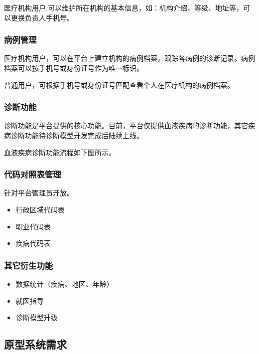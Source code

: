 \documentclass[UTF8,a4paper,12pt, onecolumn]{ctexart}
\begin{document}
医疗机构用户,可以维护所在机构的基本信息，如：机构介绍、等级、地址等，可以更换负责人手机号。

\subsubsection{病例管理}

医疗机构用户，可以在平台上建立机构的病例档案，跟踪各病例的诊断记录。病例档案可以按手机号或身份证号作为唯一标识。

普通用户，可根据手机号或身份证号匹配查看个人在医疗机构的病例档案。

\subsubsection{诊断功能}

诊断功能是平台提供的核心功能。目前，平台仅提供血液疾病的诊断功能，其它疾病诊断功能待诊断模型开发完成后陆续上线。

血液疾病诊断功能流程如下图所示。

\subsubsection{代码对照表管理}

针对平台管理员开放。

\begin{itemize}
  \item 行政区域代码表
  \item 职业代码表
  \item 疾病代码表
\end{itemize}

\subsubsection{其它衍生功能}

\begin{itemize}
  \item 数据统计（疾病、地区、年龄）
  \item 就医指导
  \item 诊断模型升级
\end{itemize}

\subsection{原型系统需求}
\end{document}
